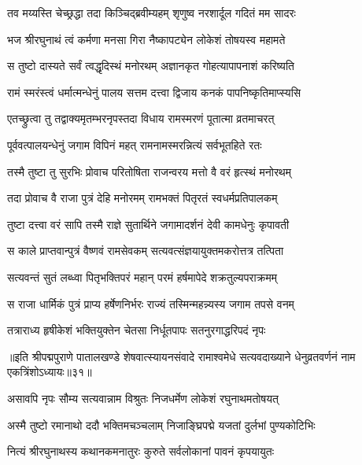 \twolineshloka
{तव मय्यस्ति चेच्छ्रद्धा तदा किञ्चिद्ब्रवीम्यहम्}
{शृणुष्व नरशार्दूल गदितं मम सादरः}%

\twolineshloka
{भज श्रीरघुनाथं त्वं कर्मणा मनसा गिरा}
{नैष्कापट्येन लोकेशं तोषयस्व महामते}%

\twolineshloka
{स तुष्टो दास्यते सर्वं त्वद्धृदिस्थं मनोरथम्}
{अज्ञानकृत गोहत्यापापनाशं करिष्यति}%

\twolineshloka
{रामं स्मरंस्त्वं धर्मात्मन्धेनुं पालय सत्तम}
{दत्त्वा द्विजाय कनकं पापनिष्कृतिमाप्स्यसि}%


\twolineshloka
{एतच्छ्रुत्वा तु तद्वाक्यमृतम्भरनृपस्तदा}
{विधाय रामस्मरणं पूतात्मा व्रतमाचरत्}%

\twolineshloka
{पूर्ववत्पालयन्धेनुं जगाम विपिनं महत्}
{रामनामस्मरन्नित्यं सर्वभूतहिते रतः}%

\twolineshloka
{तस्मै तुष्टा तु सुरभिः प्रोवाच परितोषिता}
{राजन्वरय मत्तो वै वरं हृत्स्थं मनोरथम्}%

\twolineshloka
{तदा प्रोवाच वै राजा पुत्रं देहि मनोरमम्}
{रामभक्तं पितृरतं स्वधर्मप्रतिपालकम्}%

\twolineshloka
{तुष्टा दत्त्वा वरं सापि तस्मै राज्ञे सुतार्थिने}
{जगामादर्शनं देवी कामधेनुः कृपावती}%

\twolineshloka
{स काले प्राप्तवान्पुत्रं वैष्णवं रामसेवकम्}
{सत्यवत्संज्ञयायुक्तमकरोत्तत्र तत्पिता}%

\twolineshloka
{सत्यवन्तं सुतं लब्ध्वा पितृभक्तिपरं महान्}
{परमं हर्षमापेदे शक्रतुल्यपराक्रमम्}%

\twolineshloka
{स राजा धार्मिकं पुत्रं प्राप्य हर्षेणनिर्भरः}
{राज्यं तस्मिन्महन्न्यस्य जगाम तपसे वनम्}%

\twolineshloka
{तत्राराध्य हृषीकेशं भक्तियुक्तेन चेतसा}
{निर्धूतपापः सतनुरगाद्धरिपदं नृपः}%

{॥इति श्रीपद्मपुराणे पातालखण्डे शेषवात्स्यायनसंवादे रामाश्वमेधे सत्यवदाख्याने धेनुव्रतवर्णनं नाम एकत्रिंशोऽध्यायः॥३१॥}



\twolineshloka
{असावपि नृपः सौम्य सत्यवान्नाम विश्रुतः}
{निजधर्मेण लोकेशं रघुनाथमतोषयत्}%

\twolineshloka
{अस्मै तुष्टो रमानाथो ददौ भक्तिमचञ्चलाम्}
{निजाङ्घ्रिपद्मे यजतां दुर्लभां पुण्यकोटिभिः}%

\twolineshloka
{नित्यं श्रीरघुनाथस्य कथानकमनातुरः}
{कुरुते सर्वलोकानां पावनं कृपयायुतः}%

